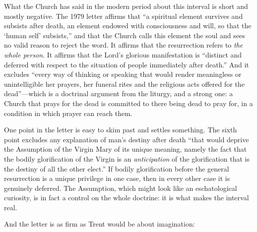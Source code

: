 What the Church has said in the modern period about this interval is short and mostly negative. The 1979 letter affirms that ``a spiritual element survives and subsists after death, an element endowed with consciousness and will, so that the `human self' subsists,'' and that the Church calls this element the soul and sees no valid reason to reject the word. It affirms that the resurrection refers to \emph{the whole person}. It affirms that the Lord's glorious manifestation is ``distinct and deferred with respect to the situation of people immediately after death.'' And it excludes ``every way of thinking or speaking that would render meaningless or unintelligible her prayers, her funeral rites and the religious acts offered for the dead''---which is a doctrinal argument from the liturgy, and a strong one: a Church that prays for the dead is committed to there being dead to pray for, in a condition in which prayer can reach them.

One point in the letter is easy to skim past and settles something. The sixth point excludes any explanation of man's destiny after death ``that would deprive the Assumption of the Virgin Mary of its unique meaning, namely the fact that the bodily glorification of the Virgin is an \emph{anticipation} of the glorification that is the destiny of all the other elect.'' If bodily glorification before the general resurrection is a unique privilege in one case, then in every other case it is genuinely deferred. The Assumption, which might look like an eschatological curiosity, is in fact a control on the whole doctrine: it is what makes the interval real.

And the letter is as firm as Trent would be about imagination:

